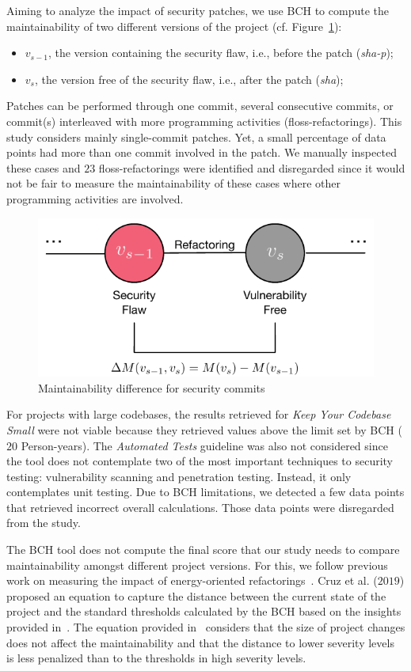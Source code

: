 \documentclass[10pt,conference]{IEEEtran}
\begin{document}
Aiming to analyze the impact of security patches, we use BCH to compute the
maintainability of two different versions of the project (cf. Figure~\ref{fig:commit}):

\begin{itemize}
	\item $v_{s-1}$, the version containing the security flaw, i.e., before the
	patch (\emph{sha-p});
	\item $v_{s}$, the version free of the security flaw, i.e., after the
	patch (\emph{sha});
\end{itemize}

Patches can be performed through one commit, several consecutive commits, or 
commit(s) interleaved with more programming activities (floss-refactorings). This study considers mainly single-commit 
patches. Yet, a small percentage of data points had more than one commit 
involved in the patch. We manually inspected these cases and $23$ 
floss-refactorings were identified and disregarded since it would not
be fair to measure the maintainability of these cases where other
programming activities are involved.

\begin{figure}[h]
 	\centering 	
	\includegraphics[width=0.6\linewidth]{figures/commit.pdf}
 	\caption{Maintainability difference for security commits}
	\label{fig:commit}
	\vspace{-0.5cm}
\end{figure}

For projects with large codebases, the results retrieved for \emph{Keep Your 
Codebase Small} were not viable because they retrieved values above the limit 
set by BCH ($20$ Person-years). The \emph{Automated Tests} guideline was also 
not considered since the tool does not contemplate two
of the most important techniques to security testing: vulnerability scanning
and penetration testing. Instead, it only contemplates unit 
testing. Due to BCH limitations, we detected a few data points
that retrieved incorrect overall calculations. 
Those data points were disregarded from the study.

The BCH tool does not compute the final score that our study needs to compare
maintainability amongst different project versions. For this, we follow previous 
work on measuring the impact of energy-oriented 
refactorings~\cite{cruz2019energyoriented}. Cruz et al. ($2019$) proposed an 
equation to capture the distance between the current state of the project and
the standard thresholds calculated by the BCH based on the insights provided 
in~\cite{Olivari:2018}. The equation provided in~\cite{cruz2019energyoriented} 
considers that the size of project changes does not affect the maintainability 
and that the distance to lower severity levels is less penalized than to the
thresholds in high severity levels.
\end{document}
